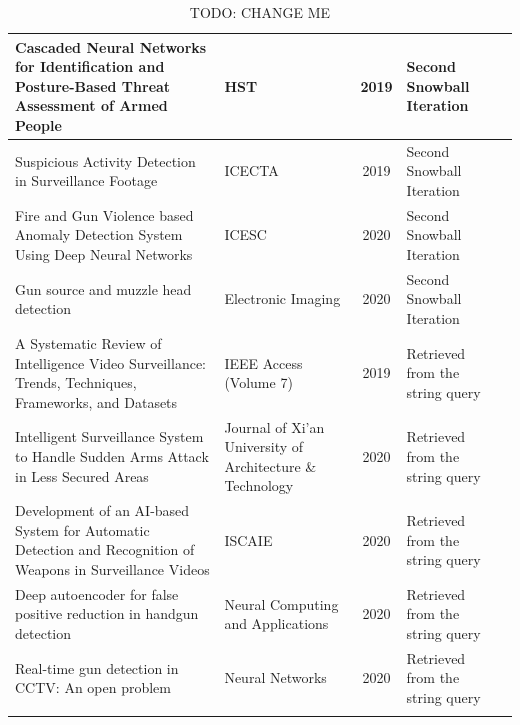 {\begin{longtable}{|p{7.5cm}|p{2.5cm}|c|p{2cm}|p{2.2cm}|}
		\hline
		Cascaded Neural Networks for Identification and Posture-Based Threat Assessment of Armed People & HST & 2019 & Second Snowball Iteration & \cite{abruzzo2019cascaded35}\\
		\hline
		Suspicious Activity Detection in Surveillance Footage & ICECTA & 2019 & Second Snowball Iteration & \cite{loganathan2019suspicious36}\\
		\hline
		Fire and Gun Violence based Anomaly Detection System Using Deep Neural Networks & ICESC & 2020 & Second Snowball Iteration & \cite{mehta2020fire37}\\
		\hline
		Gun source and muzzle head detection & Electronic Imaging & 2020 & Second Snowball Iteration & \cite{zhou2020gun38}\\
		\hline
		A Systematic Review of Intelligence Video Surveillance: Trends, Techniques, Frameworks, and Datasets & IEEE Access (Volume 7) & 2019 & Retrieved from the string query & \cite{shidik2019systematic39}\\
		\hline
		Intelligent Surveillance System to Handle Sudden Arms Attack in Less Secured Areas & Journal of Xi'an University of Architecture \& Technology & 2020 & Retrieved from the string query & \cite{pavanintelligent40}\\
		\hline
		Development of an AI-based System for Automatic Detection and Recognition of Weapons in Surveillance Videos & ISCAIE & 2020 & Retrieved from the string query & \cite{xu2020development41}\\
		\hline
		Deep autoencoder for false positive reduction in handgun detection & Neural Computing and Applications & 2020 & Retrieved from the string query & \cite{vallez2020deep42}\\
		\hline
		Real-time gun detection in CCTV: An open problem & Neural Networks & 2020 & Retrieved from the string query & \cite{gonzalez2020real43}\\
		\hline
	\caption{TODO: CHANGE ME}
	\label{tab:teste.tex}
\end{longtable}
}